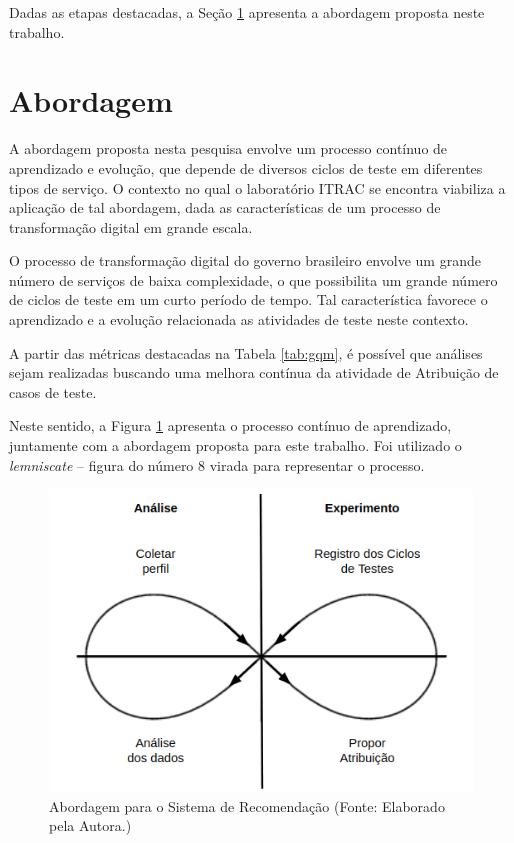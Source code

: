 Dadas as etapas destacadas, a Seção \ref{sec:abordagem} apresenta a abordagem proposta neste trabalho.

\section{Abordagem}
\label{sec:abordagem}

A abordagem proposta nesta pesquisa envolve um processo contínuo de aprendizado e evolução, que depende de diversos ciclos de teste em diferentes tipos de serviço. O contexto no qual o laboratório ITRAC se encontra viabiliza a aplicação de tal abordagem, dada as características de um processo de transformação digital em grande escala.

O processo de transformação digital do governo brasileiro envolve um grande número de serviços de baixa complexidade, o que possibilita um grande número de ciclos de teste em um curto período de tempo. Tal característica favorece o aprendizado e a evolução relacionada as atividades de teste neste contexto.

A partir das métricas destacadas na Tabela \ref{tab:gqm}, é possível que análises sejam realizadas buscando uma melhora contínua da atividade de Atribuição de casos de teste.

Neste sentido, a Figura \ref{fig:Abordagem} apresenta o processo contínuo de aprendizado, juntamente com a abordagem proposta para este trabalho. Foi utilizado o \textit{lemniscate} – figura do número 8 virada para representar o processo.

        \begin{figure}[h]
          \centering
          \includegraphics[width=13cm]{figuras/abordagem.png}
          \caption{Abordagem para o Sistema de Recomendação  (Fonte: Elaborado pela Autora.)}
          \label{fig:Abordagem}

        \end{figure}


